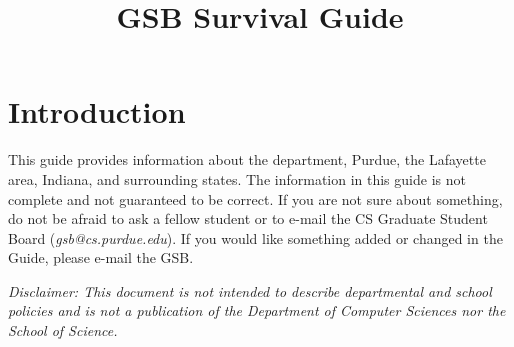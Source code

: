 \documentclass[letterpaper,10pt]{article}
\begin{document}
\date{}

\title{GSB Survival Guide}

\maketitle

\section{Introduction}
This guide provides information about the department, Purdue, the Lafayette area, Indiana, and surrounding states. The information in this guide is not complete and not guaranteed to be correct. If you are not sure about something, do not be afraid to ask a fellow student or to e-mail the CS Graduate Student Board (\emph{gsb@cs.purdue.edu}). If you would like something added or changed in the Guide, please e-mail the GSB.

\textit{Disclaimer: This document is not intended to describe departmental and school policies and is not a publication of the Department of Computer Sciences nor the School of Science.}

\tableofcontents




\end{document}
